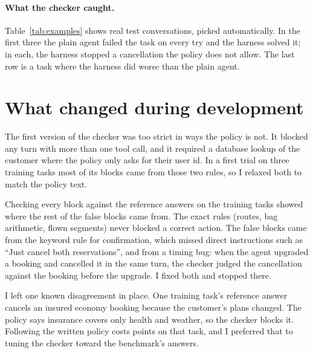 \documentclass[11pt]{article}
\begin{document}
\paragraph{What the checker caught.} Table~\ref{tab:examples} shows real test
conversations, picked automatically. In the first three the plain agent failed
the task on every try and the harness solved it; in each, the harness stopped
a cancellation the policy does not allow. The last row is a task where the
harness did worse than the plain agent.

\begin{table}[!t]
  \centering\footnotesize
  
  \caption{Real test conversations. Top: tasks the plain agent never solved
    and the harness did, with the first block in that conversation. Bottom: a
    task where the harness did worse than the plain agent.}
  \label{tab:examples}
\end{table}

\section{What changed during development}

The first version of the checker was too strict in ways the policy is not. It
blocked any turn with more than one tool call, and it required a database
lookup of the customer where the policy only asks for their user id. In a first
trial on three training tasks most of its blocks came from those two rules, so
I relaxed both to match the policy text.

Checking every block against the reference answers on the training tasks
showed where the rest of the false blocks came from. The exact rules (routes,
bag arithmetic, flown segments) never blocked a correct action. The false
blocks came from the keyword rule for confirmation, which missed direct
instructions such as ``Just cancel both reservations'', and from a timing bug:
when the agent upgraded a booking and cancelled it in the same turn, the
checker judged the cancellation against the booking before the upgrade. I
fixed both and stopped there.

\begin{table}[h]
  \centering\small
  
  \caption{Training tasks only. False blocks are blocked changes identical to
    the reference action.}
  \label{tab:dev}
\end{table}

I left one known disagreement in place. One training task's reference answer
cancels an insured economy booking because the customer's plans changed. The
policy says insurance covers only health and weather, so the checker blocks
it. Following the written policy costs points on that task, and I preferred
that to tuning the checker toward the benchmark's answers.
\end{document}
